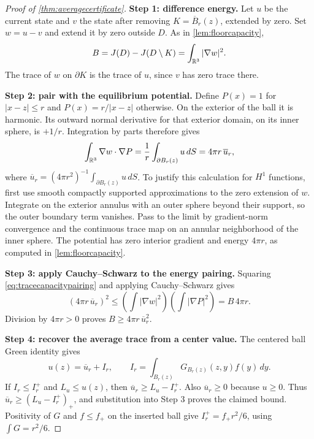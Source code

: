 \begin{proof}[Proof of \cref{thm:averagecertificate}]
\textbf{Step 1: difference energy.}
Let $u$ be the current state and $v$ the state after removing
$K=\overline B_r(z)$, extended by zero. Set $w=u-v$ and extend it by zero
outside $D$. As in \cref{lem:floorcapacity},
\[
 B=J(D)-J(D\setminus K)=\int_{\mathbb{R}^3}|\nabla w|^2.
\]
The trace of $w$ on $\partial K$ is the trace of $u$, since $v$ has zero
trace there.

\textbf{Step 2: pair with the equilibrium potential.}
Define $P(x)=1$ for $|x-z|\le r$ and $P(x)=r/|x-z|$ otherwise. On the
exterior of the ball it is harmonic. Its outward normal derivative for
that exterior domain, on its inner sphere, is $+1/r$. Integration by parts
therefore gives
\begin{equation}
 \int_{\mathbb{R}^3}\nabla w\cdot\nabla P
 =\frac1r\int_{\partial B_r(z)}u\,dS
 =4\pi r\,\overline u_r,
 \label{eq:tracecapacitypairing}
\end{equation}
where $\overline u_r=(4\pi r^2)^{-1}\int_{\partial B_r(z)}u\,dS$.
To justify this calculation for $H^1$ functions, first use smooth compactly
supported approximations to the zero extension of $w$. Integrate on the
exterior annulus with an outer sphere beyond their support, so the outer
boundary term vanishes. Pass to the limit by gradient-norm convergence
and the continuous trace map on an annular neighborhood of the inner
sphere. The potential has zero interior gradient and energy $4\pi r$,
as computed in \cref{lem:floorcapacity}.

\textbf{Step 3: apply Cauchy--Schwarz to the energy pairing.}
Squaring \cref{eq:tracecapacitypairing} and applying Cauchy--Schwarz gives
\[
 (4\pi r\,\overline u_r)^2
 \le\left(\int|\nabla w|^2\right)
       \left(\int|\nabla P|^2\right)=B\,4\pi r.
\]
Division by $4\pi r>0$ proves $B\ge4\pi r\,\overline u_r^2$.

\textbf{Step 4: recover the average trace from a center value.}
The centered ball Green identity gives
\begin{equation}
 u(z)=\overline u_r+I_r,\qquad
 I_r=\int_{B_r(z)}G_{B_r(z)}(z,y)f(y)\,dy.
 \label{eq:tracefromcenter}
\end{equation}
If $I_r\le I_r^+$ and $L_u\le u(z)$, then
$\overline u_r\ge L_u-I_r^+$. Also $\overline u_r\ge0$ because $u\ge0$.
Thus $\overline u_r\ge(L_u-I_r^+)_+$, and substitution into Step 3 proves
the claimed bound. Positivity of $G$ and $f\le f_+$ on the inserted ball
give $I_r^+=f_+r^2/6$, using $\int G=r^2/6$.


\end{proof}
